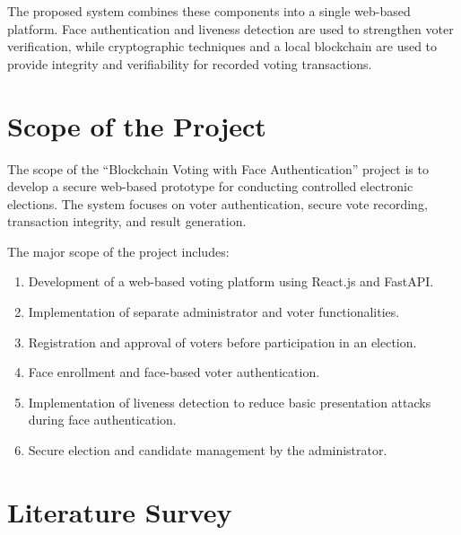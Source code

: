 \documentclass[12pt,a4paper]{report}
\begin{document}
The proposed system combines these components into a single web-based platform. Face authentication and liveness detection are used to strengthen voter verification, while cryptographic techniques and a local blockchain are used to provide integrity and verifiability for recorded voting transactions.



\chapter{Scope of the Project}

The scope of the ``Blockchain Voting with Face Authentication'' project is to develop a secure web-based prototype for conducting controlled electronic elections. The system focuses on voter authentication, secure vote recording, transaction integrity, and result generation.

The major scope of the project includes:

\begin{enumerate}[leftmargin=*, itemsep=5pt]
	
	\item Development of a web-based voting platform using React.js and FastAPI.
	
	\item Implementation of separate administrator and voter functionalities.
	
	\item Registration and approval of voters before participation in an election.
	
	\item Face enrollment and face-based voter authentication.
	
	\item Implementation of liveness detection to reduce basic presentation attacks during face authentication.
	
	\item Secure election and candidate management by the administrator.
	
\end{enumerate}

\chapter{Literature Survey}
\end{document}
